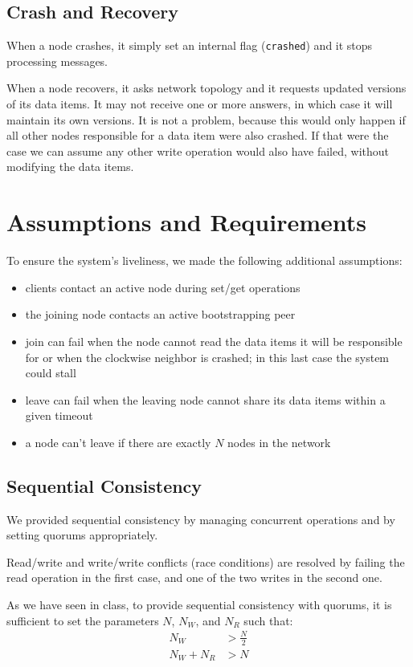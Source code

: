 \documentclass{article}
\begin{document}
\subsection{Crash and Recovery}
When a node crashes, it simply set an internal flag (\texttt{crashed}) and it 
stops processing messages. 

When a node recovers, it asks network topology and it requests updated versions 
of its data items. It may not receive one or more answers, in which case it
will maintain its own versions. It is not a problem, because this would only 
happen if all other nodes responsible for a data item were also crashed. If that 
were the case we can assume any other write operation would also have failed,
without modifying the data items.

\section{Assumptions and Requirements}
To ensure the system's liveliness, we made the following additional
assumptions:
\begin{itemize}
    \item clients contact an active node during set/get operations
    \item the joining node contacts an active bootstrapping peer
    \item join can fail when the node cannot read the data items it will 
    be responsible for or when the clockwise neighbor is crashed; in this last 
    case the system could stall
    \item leave can fail when the leaving node cannot share its data items
    within a given timeout
    \item a node can't leave if there are exactly $N$ nodes in the network
\end{itemize}

\subsection{Sequential Consistency}
We provided sequential consistency by managing concurrent operations and by
setting quorums appropriately.

Read/write and write/write conflicts (race conditions) are resolved by 
failing the read operation in the first case, and one of the two 
writes in the second one.

As we have seen in class, to provide sequential consistency with quorums, it is 
sufficient to set the parameters $N$, $N_{W}$, and $N_{R}$ such that:
\begin{align*}
    N_{W}&>\frac{N}{2} \\
    N_{W}+N_{R}&>N
\end{align*}
\end{document}

